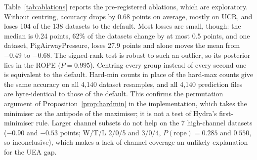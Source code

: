 Table~\ref{tab:ablations} reports the pre-registered ablations, which are exploratory.
Without centring, accuracy drops by 0.68 points on average, mostly on UCR, and \hh{} loses
104 of the 138 datasets to the default. Most losses are small, though: the median is 0.24
points, 62\% of the datasets change by at most 0.5 points, and one dataset,
PigAirwayPressure, loses 27.9 points and alone moves the mean from $-0.49$ to $-0.68$. The
signed-rank test is robust to such an outlier, so its posterior lies in the ROPE
($P=0.995$). Centring every group instead of every second one is
equivalent to the default. Hard-min counts in place of the hard-max counts give the same
accuracy on all 4,140 dataset resamples, and all 4,140 prediction files are
byte-identical to those of the default. This confirms the permutation argument of Proposition~\ref{prop:hardmin}
in the implementation, which takes the minimiser as the antipode of the maximiser; it is not
a test of Hydra's first-minimiser rule. Larger channel subsets do not help on the 7 high-channel datasets ($-0.90$ and $-0.53$
points; W/T/L 2/0/5 and 3/0/4, $P(\text{rope})=0.285$ and $0.550$, so inconclusive), which
makes a lack of channel coverage an unlikely explanation for the UEA gap.
